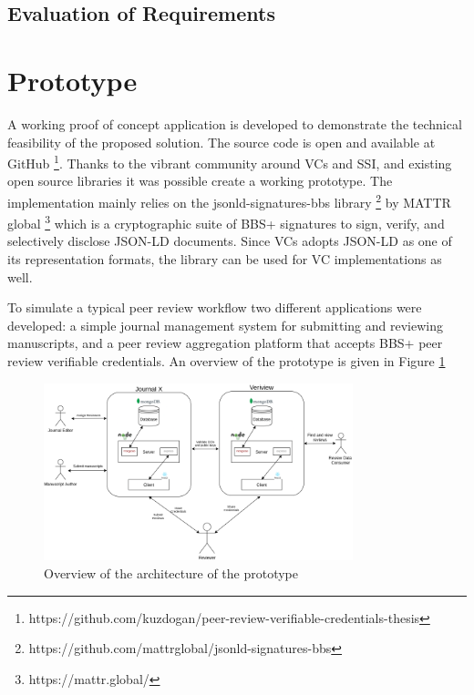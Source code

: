 
\subsection{Evaluation of Requirements}















\section{Prototype}


A working proof of concept application is developed to demonstrate the technical feasibility of the proposed solution. The source code is open and available at GitHub \footnote{https://github.com/kuzdogan/peer-review-verifiable-credentials-thesis}. Thanks to the vibrant community around VCs and SSI, and existing open source libraries it was possible create a working prototype. The implementation mainly relies on the jsonld-signatures-bbs library \footnote{https://github.com/mattrglobal/jsonld-signatures-bbs} by MATTR global \footnote{https://mattr.global/} which is a cryptographic suite of BBS+ signatures to sign, verify, and selectively disclose JSON-LD documents. Since VCs adopts JSON-LD as one of its representation formats, the library can be used for VC implementations as well.

To simulate a typical peer review workflow two different applications were developed: a simple journal management system for submitting and reviewing manuscripts, and a peer review aggregation platform that accepts BBS+ peer review verifiable credentials. An overview of the prototype is given in Figure \ref{fig:prototype}

\begin{figure}[htpb]
  \centering
  \includegraphics[width=0.8\textwidth]{figures/prototype.png}
  \caption{Overview of the architecture of the prototype} \label{fig:prototype}
\end{figure}

